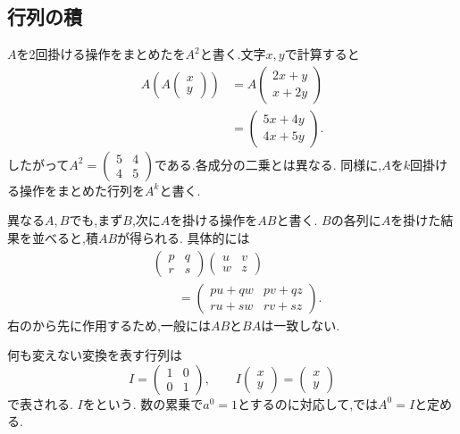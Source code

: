 \subsection{行列の積}\label{節：行列の積}
$A$を2回掛ける操作をまとめたを$A^2$と書く.文字$x,y$で計算すると
\[
  \begin{aligned}
    A\left(A\begin{pmatrix}x\\y\end{pmatrix}\right)
    &=A\begin{pmatrix}2x+y\\x+2y\end{pmatrix}\\
    &=\begin{pmatrix}5x+4y\\4x+5y\end{pmatrix}.
  \end{aligned}
\]
したがって$A^2=\begin{pmatrix}5&4\\4&5\end{pmatrix}$である.各成分の二乗とは異なる.
同様に,$A$を$k$回掛ける操作をまとめた行列を$A^k$と書く.

異なる$A,B$でも,まず$B$,次に$A$を掛ける操作を$AB$と書く.
$B$の各列に$A$を掛けた結果を並べると,積$AB$が得られる.
具体的には
\[
  \begin{aligned}
    &\begin{pmatrix}p&q\\r&s\end{pmatrix}
    \begin{pmatrix}u&v\\w&z\end{pmatrix}\\
    &\qquad=
    \begin{pmatrix}
      pu+qw&pv+qz\\
      ru+sw&rv+sz
    \end{pmatrix}.
  \end{aligned}
\]
右のから先に作用するため,一般には$AB$と$BA$は一致しない.

何も変えない変換を表す行列は
\[
  I=\begin{pmatrix}1&0\\0&1\end{pmatrix},
  \qquad
  I\begin{pmatrix}x\\y\end{pmatrix}
  =\begin{pmatrix}x\\y\end{pmatrix}
\]
で表される.
$I$を\textbf{}という.
数の累乗で$a^0=1$とするのに対応して,では$A^0=I$と定める.

